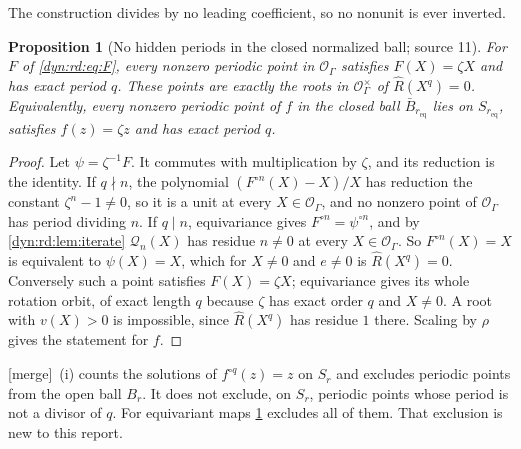 \documentclass[11pt,letterpaper]{article}
\newtheorem{proposition}[proposition]{Proposition}
\theoremstyle{definition}
\theoremstyle{remark}
\newcommand{\OO}{\mathcal O}
\newcommand{\mergetag}{\textup{\textsf{\small[merge]}}}%
\numberwithin{equation}{section}
\begin{document}
The construction divides by no leading coefficient, so no nonunit is ever
inverted.

\begin{proposition}[No hidden periods in the closed normalized ball;
source 11]\label{dyn:rd:prop:periodfinite}
For $F$ of \eqref{dyn:rd:eq:F}, every nonzero periodic point in $\OO_\Gamma$
satisfies $F(X)=\zeta X$ and has exact period $q$. These points are exactly
the roots in $\OO_\Gamma^{\times}$ of $\widehat R(X^{q})=0$. Equivalently,
every nonzero periodic point of $f$ in the closed ball
$\bar B_{r_{\mathrm{eq}}}$ lies on $S_{r_{\mathrm{eq}}}$, satisfies
$f(z)=\zeta z$ and has exact period $q$.
\end{proposition}
\begin{proof}
Let $\psi=\zeta^{-1}F$. It commutes with multiplication by $\zeta$, and its
reduction is the identity. If $q\nmid n$, the polynomial
$(F^{\circ n}(X)-X)/X$ has reduction the constant $\zeta^{n}-1\ne0$, so it
is a unit at every $X\in\OO_\Gamma$, and no nonzero point of $\OO_\Gamma$
has period dividing $n$. If $q\mid n$, equivariance gives
$F^{\circ n}=\psi^{\circ n}$, and by \cref{dyn:rd:lem:iterate}
$\mathcal Q_n(X)$ has residue $n\ne0$ at every $X\in\OO_\Gamma$. So
$F^{\circ n}(X)=X$ is equivalent to $\psi(X)=X$, which for $X\ne0$ and
$e\ne0$ is $\widehat R(X^{q})=0$. Conversely such a point satisfies
$F(X)=\zeta X$; equivariance gives its whole rotation orbit, of exact
length $q$ because $\zeta$ has exact order $q$ and $X\ne0$. A root with
$v(X)>0$ is impossible, since $\widehat R(X^{q})$ has residue $1$ there.
Scaling by $\rho$ gives the statement for $f$.
\end{proof}

\mergetag\ (i) counts the solutions of
$f^{\circ q}(z)=z$ on $S_r$ and excludes periodic points from the open ball
$B_r$. It does not exclude, on $S_r$, periodic points whose period is not a
divisor of $q$. For equivariant maps \cref{dyn:rd:prop:periodfinite}
excludes all of them. That exclusion is new to this report.
\end{document}
